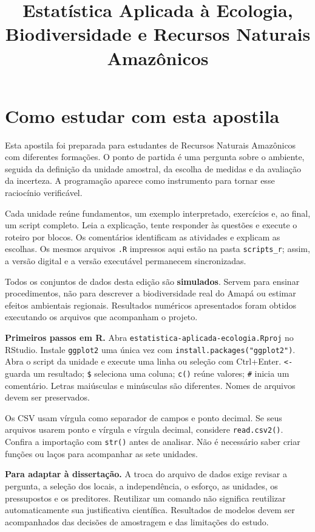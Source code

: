 \documentclass{ueap-apostila}
\title{Estatística Aplicada à Ecologia, Biodiversidade e Recursos Naturais Amazônicos}
\begin{document}
\hypersetup{pageanchor=false}
\capaueap
\frontmatter
\fancyhead[R]{\small\textcolor{UEAPDarkGreen}{Orientações e sumário}}
\hypersetup{pageanchor=true}
\renewcommand{\contentsname}{Sumário}
\chapter*{Como estudar com esta apostila}
Esta apostila foi preparada para estudantes de Recursos Naturais Amazônicos com diferentes formações. O ponto de partida é uma pergunta sobre o ambiente, seguida da definição da unidade amostral, da escolha de medidas e da avaliação da incerteza. A programação aparece como instrumento para tornar esse raciocínio verificável.

Cada unidade reúne fundamentos, um exemplo interpretado, exercícios e, ao final, um script completo. Leia a explicação, tente responder às questões e execute o roteiro por blocos. Os comentários identificam as atividades e explicam as escolhas. Os mesmos arquivos \texttt{.R} impressos aqui estão na pasta \texttt{scripts\_r}; assim, a versão digital e a versão executável permanecem sincronizadas.

\begin{atencao}
Todos os conjuntos de dados desta edição são \textbf{simulados}. Servem para ensinar procedimentos, não para descrever a biodiversidade real do Amapá ou estimar efeitos ambientais regionais. Resultados numéricos apresentados foram obtidos executando os arquivos que acompanham o projeto.
\end{atencao}

\textbf{Primeiros passos em R.} Abra \texttt{estatistica-aplicada-ecologia.Rproj} no RStudio. Instale \texttt{ggplot2} uma única vez com \texttt{install.packages("ggplot2")}. Abra o script da unidade e execute uma linha ou seleção com Ctrl+Enter. \texttt{<-} guarda um resultado; \texttt{\$} seleciona uma coluna; \texttt{c()} reúne valores; \texttt{\#} inicia um comentário. Letras maiúsculas e minúsculas são diferentes. Nomes de arquivos devem ser preservados.

Os CSV usam vírgula como separador de campos e ponto decimal. Se seus arquivos usarem ponto e vírgula e vírgula decimal, considere \texttt{read.csv2()}. Confira a importação com \texttt{str()} antes de analisar. Não é necessário saber criar funções ou laços para acompanhar as sete unidades.

\textbf{Para adaptar à dissertação.} A troca do arquivo de dados exige revisar a pergunta, a seleção dos locais, a independência, o esforço, as unidades, os pressupostos e os preditores. Reutilizar um comando não significa reutilizar automaticamente sua justificativa científica. Resultados de modelos devem ser acompanhados das decisões de amostragem e das limitações do estudo.
\end{document}
